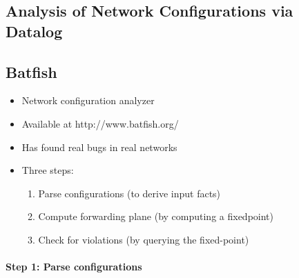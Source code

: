 \subsection{Analysis of Network Configurations via Datalog}
\begin{minipage}{\linewidth}
    \centering      
    \def\svgwidth{\linewidth}
        
\end{minipage}
\subsection{Batfish}
\begin{itemize}
\item Network configuration analyzer
 \item Available at http://www.batfish.org/
 \item Has found real bugs in real networks
 \item Three steps:
 \begin{enumerate}
    \item Parse configurations (to derive input facts)
    \item Compute forwarding plane (by computing a fixedpoint)
    \item Check for violations (by querying the fixed-point)
\end{enumerate}
\end{itemize}

\paragraph{Step 1: Parse configurations\newline}
\begin{minipage}{\linewidth}
    \centering      
    \def\svgwidth{\linewidth}
        
\end{minipage}
